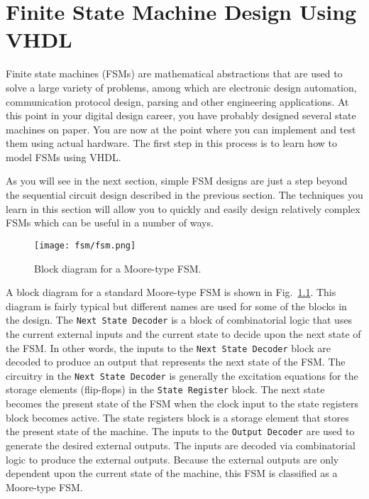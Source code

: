 %
%
\chapter{Finite State Machine Design Using VHDL}
Finite state machines (FSMs) are mathematical abstractions that are used to solve a large variety of problems, among which are electronic design automation, communication protocol design, parsing and other engineering applications. At this point in your digital design career, you have probably designed several state machines on paper. You are now at the point where you can implement and test them using actual hardware. The first step in this process is to learn how to model FSMs using VHDL. 

As you will see in the next section, simple FSM designs are just a step beyond the sequential circuit design described in the previous section. The techniques you learn in this section will allow you to quickly and easily design relatively complex FSMs which can be useful in a number of ways.

\begin{figure}
    \centering
	\texttt{[image: fsm/fsm.png]}
	\caption{Block diagram for a Moore-type FSM.}
	\label{fsm}
\end{figure}

A block diagram for a standard Moore-type FSM is shown in Fig.~\ref{fsm}. This diagram is fairly typical but different names are used for some of the blocks in the design. The \texttt{Next State Decoder} is a block of combinatorial logic that uses the current external inputs and the current state to decide upon the next state of the FSM. In other words, the inputs to the \texttt{Next State Decoder} block are decoded to produce an output that represents the next state of the FSM. The circuitry in the \texttt{Next State Decoder} is generally the excitation equations for the storage elements (flip-flops) in the \texttt{State Register} block. The next state becomes the present state of the FSM when the clock input to the state registers block becomes active. The state registers block is a storage element that stores the present state of the machine. The inputs to the \texttt{Output Decoder} are used to generate the desired external outputs. The inputs are decoded via combinatorial logic to produce the external outputs. Because the external outputs are only dependent upon the current state of the machine, this FSM is classified as a Moore-type FSM.

